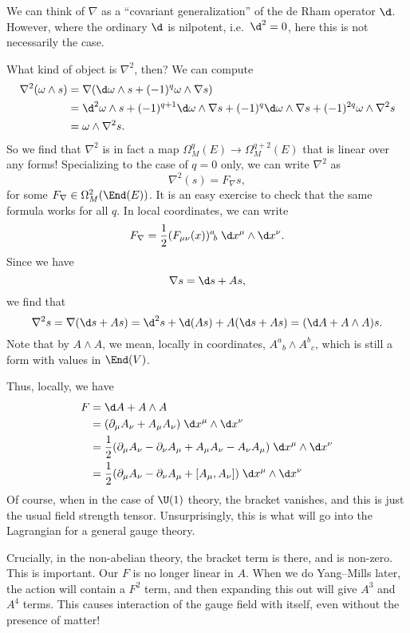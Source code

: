 \documentclass[a4paper]{article}
\begin{document}
We can think of $\nabla$ as a ``covariant generalization'' of the de Rham operator $\d$. However, where the ordinary $\d$ is nilpotent, i.e.\ $\d^2 = 0$, here this is not necessarily the case.

What kind of object is $\nabla^2$, then? We can compute
\begin{align*}
  \nabla^2 (\omega \wedge s) &= \nabla(\d \omega \wedge s + (-1)^q \omega \wedge \nabla s)\\
  &= \d^2 \omega \wedge s + (-1)^{q + 1}\d \omega \wedge \nabla s + (-1)^q \d \omega \wedge \nabla s + (-1)^{2q} \omega \wedge \nabla^2 s\\
  &= \omega \wedge \nabla^2 s.
\end{align*}
So we find that $\nabla^2$ is in fact a map $\Omega^q_M(E) \to \Omega^{q + 2}_M(E)$ that is linear over any forms! Specializing to the case of $q = 0$ only, we can write $\nabla^2$ as
\[
  \nabla^2(s) = F_\nabla s,
\]
for some $F_\nabla \in \Omega^2_M(\End(E))$. It is an easy exercise to check that the same formula works for all $q$. In local coordinates, we can write
\[
  F_\nabla = \frac{1}{2} (F_{\mu\nu}(x))^a\!_b\; \d x^\mu \wedge \d x^\nu.
\]
Since we have
\[
  \nabla s = \d s + A s,
\]
we find that
\[
  \nabla^2 s = \nabla(\d s + A s) = \d^2 s + \d (As) + A(\d s + A s) = (\d A + A \wedge A) s.
\]
Note that by $A\wedge A$, we mean, locally in coordinates, $A^a\!_b \wedge A^b\!_c$, which is still a form with values in $\End(V)$.

Thus, locally, we have
\begin{align*}
  F &= \d A + A \wedge A \\
  &= (\partial_\mu A_\nu + A_\mu A_\nu)\; \d x^\mu \wedge \d x^\nu\\
  &= \frac{1}{2} (\partial_\mu A_\nu - \partial_\nu A_\mu + A_\mu A_\nu - A_\nu A_\mu)\;\d x^\mu \wedge \d x^\nu\\
  &= \frac{1}{2} (\partial_\mu A_\nu - \partial_\nu A_\mu + [A_\mu, A_\nu])\; \d x^\mu \wedge \d x^\nu
\end{align*}
Of course, when in the case of $\U(1)$ theory, the bracket vanishes, and this is just the usual field strength tensor. Unsurprisingly, this is what will go into the Lagrangian for a general gauge theory.

Crucially, in the non-abelian theory, the bracket term is there, and is non-zero. This is important. Our $F$ is no longer linear in $A$. When we do Yang--Mills later, the action will contain a $F^2$ term, and then expanding this out will give $A^3$ and $A^4$ terms. This causes interaction of the gauge field with itself, even without the presence of matter!
\end{document}
